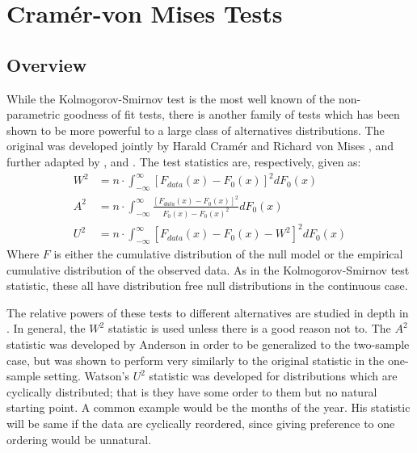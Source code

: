 
\section{Cram\'{e}r-von Mises Tests}

\subsection{Overview}

While the Kolmogorov-Smirnov test is the most well known of the non-parametric goodness of fit tests, there is another family of 
tests which has been shown to be more powerful to a large class of alternatives distributions. The original was developed jointly by
Harald Cram\'{e}r and Richard von Mises \citep{cramer1928, vonmises1928}, and further adapted by \cite{anderson1952}, and 
\cite{Watson1961}. The test statistics are, respectively, given as:
\begin{align}
W^2 &= n \cdot \int_{-\infty}^{\infty} \left[ F_{data}(x)- F_{0}(x) \right]^2 dF_0(x) \\
A^2 &= n \cdot \int_{-\infty}^{\infty} \frac{\left[F_{data}(x)- F_{0}(x) \right]^2}{F_0(x) -F_0(x)^2} dF_0(x) \\
U^2 &= n \cdot \int_{-\infty}^{\infty} \left[ F_{data}(x)- F_{0}(x) - W^2 \right]^2 dF_0(x)
\end{align}
Where $F$ is either the cumulative distribution of the null model or the empirical cumulative distribution of the observed data.
As in the Kolmogorov-Smirnov test statistic, these all have distribution free null distributions in the continuous case. 

The relative powers of these tests to different alternatives are studied in depth in \cite{stephens1974}. In general, the $W^2$
statistic is used unless there is a good reason not to. The $A^2$ statistic was developed by Anderson in order to be
generalized to the two-sample case, but was shown to perform very similarly to the original statistic in the one-sample
setting. Watson's $U^2$ statistic was developed for distributions which are cyclically distributed; that is they have some
order to them but no natural starting point. A common example would be the months of the year. His statistic will be same
if the data are cyclically reordered, since giving preference to one ordering would be unnatural. 

